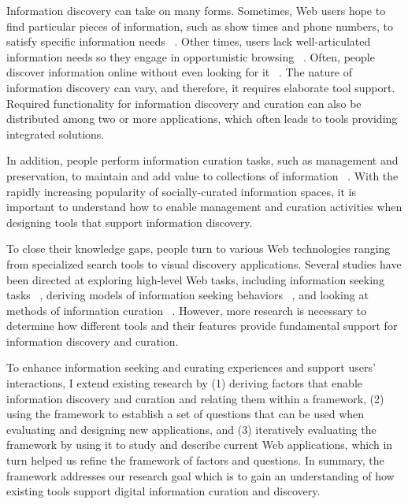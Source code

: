 Information discovery can take on many forms. Sometimes, Web users hope to find particular pieces of information, such as show times and phone numbers, to satisfy specific information needs ~\cite{proper}. Other times, users lack well-articulated information needs so they engage in opportunistic browsing ~\cite{lindley}. Often, people discover information online without even looking for it ~\cite{bates1986}. The nature of information discovery can vary, and therefore, it requires elaborate tool support. Required functionality for information discovery and curation can also be distributed among two or more applications, which often leads to tools providing integrated solutions.

In addition, people perform information curation tasks, such as management and preservation, to maintain and add value to collections of information ~\cite{beagrie}. With the rapidly increasing popularity of socially-curated information spaces, it is important to understand how to enable management and curation activities when designing tools that support information discovery.

To close their knowledge gaps, people turn to various Web technologies ranging from specialized search tools to visual discovery applications. Several studies have been directed at exploring high-level Web tasks, including information seeking tasks ~\cite{kellar2006, kellar2007, morrison, sellen}, deriving models of information seeking behaviors ~\cite{choo, ellis1989, ellis1993, ellis1997, bates1986, bates2002}, and looking at methods of information curation ~\cite{beagrie, wittaker}. However, more research is necessary to determine how different tools and their features provide fundamental support for information discovery and curation.

To enhance information seeking and curating experiences and support users' interactions, I extend existing research by (1) deriving factors that enable information discovery and curation and relating them within a framework, (2) using the framework to establish a set of questions that can be used when evaluating and designing new applications, and (3) iteratively evaluating the framework by using it to study and describe current Web applications, which in turn helped us refine the framework of factors and questions. In summary, the framework addresses our research goal which is to gain an understanding of how existing tools support digital information curation and discovery. 



